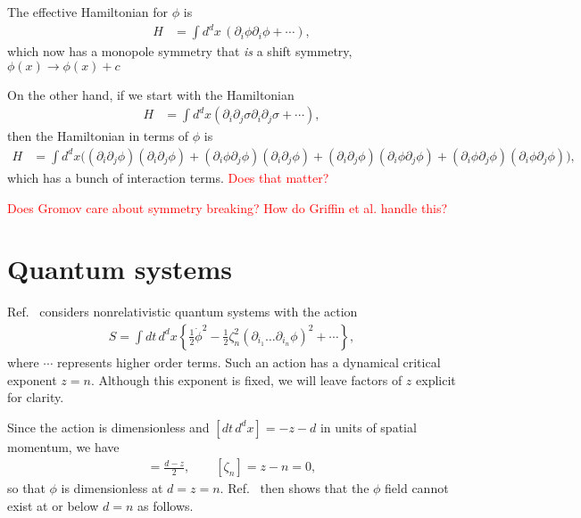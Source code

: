 \documentclass[12pt]{article}
\newcommand{\note}[1]{\textcolor{red}{#1}}
\renewcommand{\th}[1]{\frac{1}{#1}}
\newcommand{\half}{\th{2}}
\newcommand{\goesto}{\rightarrow}
\begin{document}
The effective Hamiltonian for $\phi$ is 
\begin{align}
H &= \int d^dx\,\left( \partial_i\phi \partial_i\phi + \cdots \right),
\end{align}
which now has a monopole symmetry that \emph{is} a shift symmetry, $\phi(x)\goesto \phi(x)+c$

On the other hand, if we start with the Hamiltonian
\begin{align}
H &= \int d^dx \left( \partial_i\partial_j \sigma \partial_i \partial_j \sigma + \cdots \right),
\end{align}
then the Hamiltonian in terms of $\phi$ is
\begin{align}
H &= \int d^dx \big( (\partial_i \partial_j \phi) (\partial_i \partial_j \phi) + (\partial_i \phi \partial_j \phi) (\partial_i \partial_j \phi) + (\partial_i \partial_j \phi) (\partial_i \phi \partial_j \phi) + (\partial_i \phi \partial_j \phi) (\partial_i \phi \partial_j \phi) \big),
\end{align}
which has a bunch of interaction terms. \note{Does that matter?}

\note{Does Gromov care about symmetry breaking? How do Griffin et al. handle this?}

\section{Quantum systems}

Ref.~\cite{Griffin2015} considers nonrelativistic quantum systems with the action
\begin{align}
S = \int dt\, d^dx \left\{ \half \dot{\phi}^2 -\half \zeta_n^2 (\partial_{i_1} \dots \partial_{i_n} \phi)^2 + \cdots \right\},
\end{align}
where $\cdots$ represents higher order terms. Such an action has a dynamical critical exponent $z = n$. Although this exponent is fixed, we will leave factors of $z$ explicit for clarity.

Since the action is dimensionless and $[dt\,d^dx] = -z-d$ in units of spatial momentum, we have 
\begin{align}
[\phi] = \frac{d-z}{2},\qquad [\zeta_n] = z-n = 0,
\end{align}
so that $\phi$ is dimensionless at $d=z=n$. Ref.~\cite{Griffin2015} then shows that the $\phi$ field cannot exist at or below $d=n$ as follows.
\end{document}
